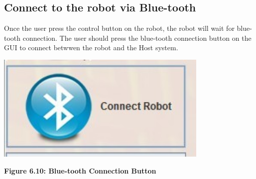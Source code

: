 \documentclass[11pt, a4paper]{report}
\begin{document}
\subsection{Connect to the robot via Blue-tooth}
Once the user press the control button on the robot, the robot will wait for blue-tooth connection. The user should press the blue-tooth connection button on the GUI to connect betwwen the robot and the Host system.
 \begin{center}
 \includegraphics[width=10.20cm]{ConnectButton.jpg}
\end{center}
\begin{center}
\textbf {Figure 6.10: Blue-tooth Connection Button } \\[0.3cm]
\end{center}
\end{document}
